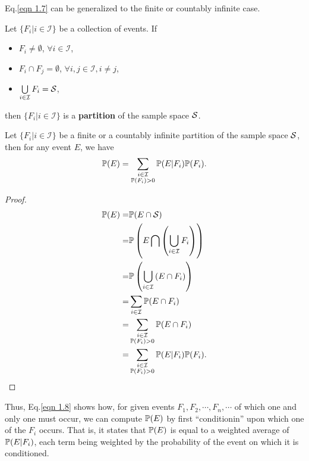 Eq.\eqref{eqn 1.7} can be generalized to the finite or countably infinite case.

\begin{definition}[Partitions]
    Let $\{ F_i | i \in \mathcal{I} \}$ be a collection of events. If
    \begin{itemize}
        \item $F_i \neq \emptyset$, $\forall i \in \mathcal{I}$,
        \item $F_i \cap F_j = \emptyset$, $\forall i, j \in \mathcal{I}, i \neq j$,
        \item $\bigcup\limits_{i \in \mathcal{I}} F_i = \mathcal{S}$,
    \end{itemize}
    then $\{ F_i | i \in \mathcal{I} \}$ is a \textbf{partition} of the sample space $\mathcal{S}$.
\end{definition}

\begin{theorem}
    Let $\{ F_i | i \in \mathcal{I} \}$ be a finite or a countably infinite partition of the sample space $\mathcal{S}$, then for any event $E$, we have 
    \begin{equation}\label{eqn 1.8}
        \mathbb{P} (E) = \sum_{\substack{i \in \mathcal{I} \\ \mathbb{P}(F_i) > 0}} \mathbb{P} (E | F_i) \mathbb{P} (F_i).
    \end{equation}
    
    \begin{proof}
        \begin{align*}
            \mathbb{P} (E) = & \mathbb{P} (E \cap \mathcal{S}) \\ 
            = & \mathbb{P} \left(E \bigcap \left(\bigcup\limits_{i\in\mathcal{I}} F_i \right) \right) \\ 
            = & \mathbb{P} \left( \bigcup\limits_{i \in \mathcal{I}} \left( E \cap F_i \right) \right) \\ 
            = & \sum_{i \in \mathcal{I}} \mathbb{P} (E \cap F_i) \\ 
            = & \sum_{\substack{i \in \mathcal{I} \\ \mathbb{P}(F_i) > 0}} \mathbb{P} (E \cap F_i) \\ 
            = & \sum_{\substack{i \in \mathcal{I} \\ \mathbb{P}(F_i) > 0}} \mathbb{P} (E | F_i) \mathbb{P} (F_i).
        \end{align*}
    \end{proof}
\end{theorem}

Thus, Eq.\eqref{eqn 1.8} shows how, for given events $F_1, F_2 , \cdots , F_n, \cdots$ of which one and only one must occur, we can compute $\mathbb{P}(E)$ by first ``conditionin'' upon which one of the $F_i$ occurs. That is, it states that $\mathbb{P}(E)$ is equal to a weighted average of $\mathbb{P} (E|F_i)$, each term being weighted by the probability of the event on which it is conditioned.

